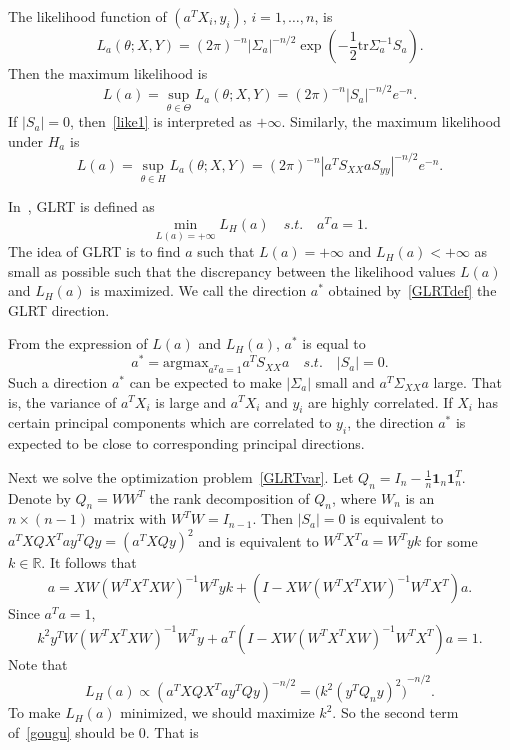 \documentclass[review]{elsarticle}
\theoremstyle{plain}
\theoremstyle{definition}
\theoremstyle{remark}
\begin{document}
     The likelihood function of $(a^T X_i,y_i)$, $i=1,\ldots,n$,  is 
\begin{equation}
L_a(\theta;X,Y)={(2\pi)}^{-n}|\Sigma_a|^{-n/2}\exp{(-\frac{1}{2}\textrm{tr}\Sigma_a^{-1}S_a)}.
\end{equation}
Then the maximum likelihood is
    \begin{equation}\label{like1}
        L(a)=\sup_{\theta\in \Theta}L_a(\theta ;X,Y)={(2\pi)}^{-n} |S_a|^{-n/2}e^{-n}.
\end{equation}
    If $|S_a|=0$, then~\ref{like1} is interpreted as $+\infty$.
    Similarly, the maximum likelihood under $H_a$ is
\begin{equation}
    L(a)=\sup_{\theta\in H}L_a(\theta ;X,Y)={(2\pi)}^{-n} |a^T S_{XX}aS_{yy}|^{-n/2}e^{-n}.
\end{equation}

    In~\cite{Zhao2016A}, GLRT is defined as
    \begin{equation} \label{GLRTdef}
        \min_{L(a)=+\infty} L_H(a)\quad s.t.\quad a^T a=1.
    \end{equation}
    The idea of GLRT is to find $a$ such that $L(a)=+\infty$ and $L_{H}(a)<+\infty$ as small as possible such that the discrepancy between the likelihood values $L(a)$ and $L_H (a)$ is maximized. We call the direction $a^*$ obtained  by~\eqref{GLRTdef} the GLRT direction.
    
    From the expression of $L(a)$ and $L_H(a)$,  $a^*$ is equal to%
    \begin{equation} \label{GLRTvar}
        a^*=\textrm{argmax}_{a^T a=1} a^T S_{XX} a \quad s.t.\quad |S_a|=0.
    \end{equation}
    Such a direction $a^*$ can be expected to make $|\Sigma_a|$ small and $a^T \Sigma_{XX} a$ large.
    That is, the variance of $a^T X_i$ is large and $a^T X_i$ and $y_i$ are highly correlated.
    If $X_i$ has certain principal components which are correlated to $y_i$, the direction $a^*$ is expected to be close to corresponding principal directions.


    Next we solve the optimization problem~\eqref{GLRTvar}. Let $Q_n=I_n-\frac{1}{n}\textbf{1}_n\textbf{1}_n^T$. Denote by $Q_n=WW^T$ the rank decomposition of $Q_n$, where $W_n$ is an $n\times (n-1)$ matrix with $W^T W=I_{n-1}$. 
    Then $|S_a|=0$ is equivalent to $a^T X Q X^T a y^T Q y={(a^T X Q y)}^2$ and is equivalent to $W^T X^T a=W^T y k$ for some $k\in \mathbb{R}$. It follows that
    \begin{equation}
        a=XW{(W^T X^T X W)}^{-1} W^T y k + (I-XW{(W^T X^T X W)}^{-1}W^T X^T)a.
    \end{equation}
Since $a^T a=1$,
    \begin{equation}\label{gougu}
        k^2 y^T W{(W^T X^T X W)}^{-1} W^T y + a^T(I-XW{(W^T X^T X W)}^{-1}W^T X^T)a=1.
    \end{equation}
Note that 
    \begin{equation}
        L_H (a)\propto {(a^T X Q X^T a y^T Q y)}^{-n/2}={\big(k^2{(y^T Q_n y)}^2\big)}^{-n/2}.
    \end{equation}
    To make $L_H(a)$ minimized, we should maximize $k^2$. So the second term of~\ref{gougu} should be $0$. That is
\end{document}
